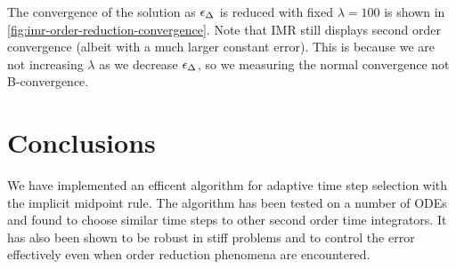 The convergence of the solution as $\epsilon_{\Delta_{}}$ is reduced with fixed $\lambda = 100$ is shown in \autoref{fig:imr-order-reduction-convergence}.
Note that IMR still displays second order convergence (albeit with a much larger constant error). 
This is because we are not increasing $\lambda$ as we decrease $\epsilon_{\Delta_{}}$, so we measuring the normal convergence not B-convergence.


\section{Conclusions}

We have implemented an efficent algorithm for adaptive time step selection with the implicit midpoint rule.
The algorithm has been tested on a number of ODEs and found to choose similar time steps to other second order time integrators.
It has also been shown to be robust in stiff problems and to control the error effectively even when order reduction phenomena are encountered.


